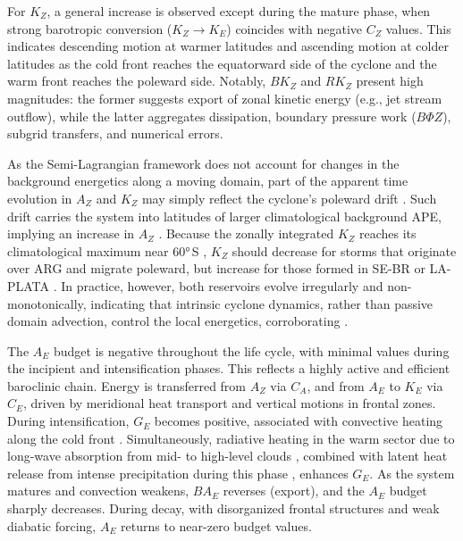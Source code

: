 \documentclass[pdflatex,sn-chicago]{sn-jnl}%
\theoremstyle{plain}
\theoremstyle{definition}
\theoremstyle{remark}
\theoremstyle{definition}
\begin{document}
For $K_Z$, a general increase is observed except during the mature phase, when strong barotropic conversion ($K_Z \rightarrow K_E$) coincides with negative $C_Z$ values. This indicates descending motion at warmer latitudes and ascending motion at colder latitudes as the cold front reaches the equatorward side of the cyclone and the warm front reaches the poleward side. Notably, $BK_Z$ and $RK_Z$ present high magnitudes: the former suggests export of zonal kinetic energy (e.g., jet stream outflow), while the latter aggregates dissipation, boundary pressure work ($B\Phi Z$), subgrid transfers, and numerical errors. 

As the Semi-Lagrangian framework does not account for changes in the background energetics along a moving domain, part of the apparent time evolution in \(A_Z\) and \(K_Z\) may simply reflect the cyclone’s poleward drift \citep{couto2024new}. Such drift carries the system into latitudes of larger climatological background APE, implying an increase in \(A_Z\) \citep{novak2018local, liu2024systematic}. Because the zonally integrated \(K_Z\) reaches its climatological maximum near 60°\,S \citep{novak2018local, liu2024systematic}, \(K_Z\) should decrease for storms that originate over ARG and migrate poleward, but increase for those formed in SE-BR or LA-PLATA . In practice, however, both reservoirs evolve irregularly and non-monotonically, indicating that intrinsic cyclone dynamics, rather than passive domain advection, control the local energetics, corroborating \citet{federer2025synoptic}.

The $A_E$ budget is negative throughout the life cycle, with minimal values during the incipient and intensification phases. This reflects a highly active and efficient baroclinic chain. Energy is transferred from $A_Z$ via $C_A$, and from $A_E$ to $K_E$ via $C_E$, driven by meridional heat transport and vertical motions in frontal zones. During intensification, $G_E$ becomes positive, associated with convective heating along the cold front \citep[e.g.,][]{govekar2011three}. Simultaneously, radiative heating in the warm sector due to long-wave absorption from mid- to high-level clouds \citep{lau1997comparing,keshtgar2023cloud}, combined with latent heat release from intense precipitation during this phase \citep{mcerlich2023assessment}, enhances $G_E$. As the system matures and convection weakens, $BA_E$ reverses (export), and the $A_E$ budget sharply decreases. During decay, with disorganized frontal structures and weak diabatic forcing, $A_E$ returns to near-zero budget values.
\end{document}
